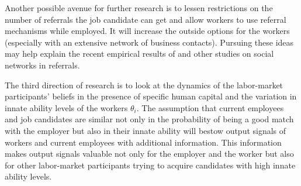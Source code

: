 \documentclass[12pt]{article}
\begin{document}
Another possible avenue for further research is to lessen restrictions on the number of referrals the job candidate can get and allow workers to use referral mechanisms while employed. It will increase the outside options for the workers (especially with an extensive network of business contacts). Pursuing these ideas may help explain the recent empirical results of \cite{lester2021heterogeneous} and other studies on social networks in referrals.

The third direction of research is to look at the dynamics of the labor-market participants' beliefs in the presence of specific human capital and the variation in innate ability levels of the workers $\theta_i$. The assumption that current employees and job candidates are similar not only in the probability of being a good match with the employer but also in their innate ability will bestow output signals of workers and current employees with additional information. This information makes output signals valuable not only for the employer and the worker but also for other labor-market participants trying to acquire candidates with high innate ability levels.

\singlespacing
\setlength\bibsep{0pt}





\clearpage

\onehalfspacing










\clearpage
\end{document}
